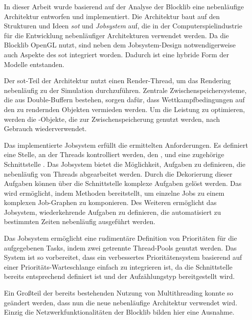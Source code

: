 In dieser Arbeit wurde basierend auf der Analyse der Blocklib eine nebenläufige Architektur entworfen und implementiert. Die Architektur baut auf den Strukturen und Ideen \emph{\acf{sot}} und \emph{Jobsystem} auf, die in der Computerspielindustrie für die Entwicklung nebenläufiger Architekturen verwendet werden. Da die Blocklib OpenGL nutzt, sind neben dem Jobsystem-Design notwendigerweise auch Aspekte des \ac{sot} integriert worden. Dadurch ist eine hybride Form der Modelle entstanden.

Der \ac{sot}-Teil der Architektur nutzt einen Render-Thread, um das Rendering nebenläufig zu der Simulation durchzuführen. Zentrale Zwischenspeichersysteme, die aus Double-Buffern bestehen, sorgen dafür, dass Wettkampfbedingungen auf den zu rendernden Objekten vermieden werden. Um die Leistung zu optimieren, werden die \classRenderedRenderable{}-Objekte, die zur Zwischenspeicherung genutzt werden, nach Gebrauch wiederverwendet.

Das implementierte Jobsystem erfüllt die ermittelten Anforderungen. Es definiert eine Stelle, an der Threads kontrolliert werden, den \classBlocklibExecutor{}, und eine zugehörige Schnittstelle \classBlocklibExecutorService{}. Das Jobsystem bietet die Möglichkeit, Aufgaben zu definieren, die nebenläufig von Threads abgearbeitet werden. Durch die Dekorierung dieser Aufgaben können über die Schnittstelle \classCompletionStage{} komplexe Aufgaben gelöst werden. Das wird ermöglicht, indem \classCompletionStage{} Methoden bereitstellt, um einzelne Jobs zu einem komplexen Job-Graphen zu komponieren. Des Weiteren ermöglicht das Jobsystem, wiederkehrende Aufgaben zu definieren, die automatisiert zu bestimmten Zeiten nebenläufig ausgeführt werden.

Das Jobsystem ermöglicht eine rudimentäre Definition von Prioritäten für die aufgegebenen Tasks, indem zwei getrennte Thread-Pools genutzt werden. Das System ist so vorbereitet, dass ein verbessertes Prioritätensystem basierend auf einer Prioritäts-Warteschlange einfach zu integrieren ist, da die Schnittstelle \classBlocklibExecutorService{} bereits entsprechend definiert ist und der Aufzählungstyp \classTaskPriority{} bereitgestellt wird.

Ein Großteil der bereits bestehenden Nutzung von Multithreading konnte so geändert werden, dass nun die neue nebenläufige Architektur verwendet wird. Einzig die Netzwerkfunktionalitäten der Blocklib bilden hier eine Ausnahme.

